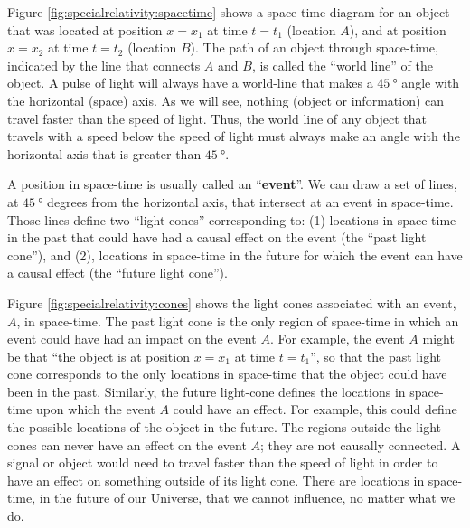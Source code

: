 Figure \ref{fig:specialrelativity:spacetime} shows a space-time diagram for an object that was located at position $x=x_1$ at time $t=t_1$ (location $A$), and at position $x=x_2$ at time $t=t_2$ (location $B$). The path of an object through space-time, indicated by the line that connects $A$ and $B$, is called the ``world line'' of the object.
A pulse of light will always have a world-line that makes a $\SI{45}{\degree}$ angle with the horizontal (space) axis. As we will see, nothing (object or information) can travel faster than the speed of light. Thus, the world line of any object that travels with a speed below the speed of light must always make an angle with the horizontal axis that is greater than $\SI{45}{\degree}$.

A position in space-time is usually called an ``\textbf{event}''. We can draw a set of lines, at $\SI{45}{\degree}$ degrees from the horizontal axis, that intersect at an event in space-time. Those lines define two ``light cones'' corresponding to: (1) locations in space-time in the past that could have had a causal effect on the event (the ``past light cone''), and (2), locations in space-time in the future for which the event can have a causal effect (the ``future light cone'').

Figure \ref{fig:specialrelativity:cones} shows the light cones associated with an event, $A$, in space-time. The past light cone is the only region of space-time in which an event could have had an impact on the event $A$. For example, the event $A$ might be that ``the object is at position $x=x_1$ at time $t=t_1$'', so that the past light cone corresponds to the only locations in space-time that the object could have been in the past. Similarly, the future light-cone defines the locations in space-time upon which the event $A$ could have an effect. For example, this could define the possible locations of the object in the future. The regions outside the light cones can never have an effect on the event $A$; they are not causally connected. A signal or object would need to travel faster than the speed of light in order to have an effect on something outside of its light cone. There are locations in space-time, in the future of our Universe, that we cannot influence, no matter what we do.

